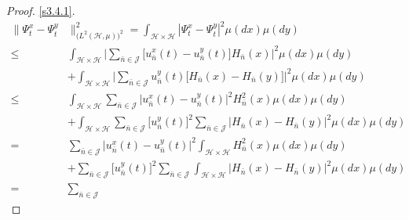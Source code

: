 \documentclass[review,onefignum,onetabnum]{siamart190516}
\begin{document}
\begin{proof}
\eqref{s3.4.1}.
%
\begin{equation}
\label{s3.8.1}
    \begin{aligned}
        \| \Psi_t ^ x - \Psi_t ^ y & \|_{
            \big(
                L^2(\mathcal{H},\mu)
            \big)^2
        }^2
            =
                \int_{\mathcal{H}\times \mathcal{H}}
                |\Psi_t^x - \Psi_t^y|^2 \mu(dx) \mu(dy)
            \\
            \le&
            \int_{\mathcal{H} \times \mathcal{H}}
                \Big|
                    \sum_{\bar n\in \mathcal{J}}
                    \big[
                        u_{\bar n} ^ x(t) - u_{\bar n} ^ y(t)
                    \big]
                    H_{\bar n}(x)
                \Big|^2
                \mu(dx) \mu(dy)
            \\
            &+
            \int_{\mathcal{H}\times \mathcal{H}}
            \Big|
                \sum_{\bar n\in \mathcal{J}}
                    u_{\bar n}^y(t)
                    \big[
                        H_{\bar n}(x) - H_{\bar n}(y)
                    \big]
            \Big|^2
            \mu(dx) \mu(dy)
            \\
            \le&
            \int_{\mathcal{H} \times \mathcal{H}}
            \sum_{\bar n\in \mathcal{J}}
            \big|
                u_{\bar n}^x(t) - u_{\bar n}^y(t)
            \big |^2
            H_{\bar n}^2(x)
            \mu(dx) \mu(dy)
            \\
            &+
            \int_{\mathcal{H}\times \mathcal{H}}
            \sum_{\bar n\in \mathcal{J}}
            \big[u_{\bar n} ^ y(t) \big]^2
            \sum_{\bar n\in \mathcal{J}}
            \big|
                H_{\bar n}(x) - H_{\bar n}(y)
            \big|^2
            \mu(dx) \mu(dy)
            \\
            =&
            \sum_{\bar n\in \mathcal{J}}
            \big|
                u_{\bar n}^x(t)-u_{\bar n}^y(t)
            \big |^2
            \int_{\mathcal{H} \times \mathcal{H}}
            H_{\bar n}^2 (x)
            \mu(dx) \mu(dy)
            \\
            &+
            \sum_{\bar n\in \mathcal{J}}
            \big[
                u_{\bar n}^y(t)
            \big] ^ 2
            \sum_{\bar n\in \mathcal{J}}
            \int_{\mathcal{H}\times \mathcal{H}}
            \big|
                H_{\bar n}(x) - H_{\bar n}(y)
            \big| ^ 2 \mu(dx)\mu(dy)
            \\
            =&
            \sum_{\bar n\in \mathcal{J}}

\end{aligned}
\end{equation}
\end{proof}
\end{document}
